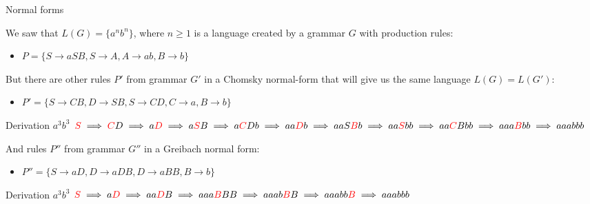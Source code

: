 \documentclass{beamer}
\begin{document}

\begin{frame}{Normal forms}

We saw that $L(G) = \{a^nb^n\}$, where $n\geq 1$ is a language created by a grammar $G$ with production rules:

\begin{itemize}
	\item $P = \{S\rightarrow aSB, S\rightarrow A, A \rightarrow ab, B\rightarrow b\}$
\end{itemize}

But there are other rules $P'$ from grammar $G'$ in a Chomsky normal-form that will give us the same language $L(G) = L(G')$:

\begin{itemize}
\item $P' = \{S \rightarrow CB, D \rightarrow SB, S \rightarrow CD, C \rightarrow a, B \rightarrow b\}$
\end{itemize}

\begin{block}{Derivation $a^3b^3$}
	$\textcolor{red}{S}\implies \textcolor{red}{C}D \implies a\textcolor{red}{D} \implies a\textcolor{red}{S}B\implies a\textcolor{red}{C}Db \implies aa\textcolor{red}{D}b \implies aaS\textcolor{red}{B}b \implies aa\textcolor{red}{S}bb \implies aa\textcolor{red}{C}Bbb \implies aaa\textcolor{red}{B}bb \implies aaabbb$
\end{block}

And rules $P''$ from grammar $G''$ in a Greibach normal form:

\begin{itemize}
\item $P'' = \{S \rightarrow aD, D \rightarrow aDB, D \rightarrow aBB, B \rightarrow b\}$
\end{itemize}

\begin{block}{Derivation $a^3b^3$}
	\footnotesize$\textcolor{red}{S}\implies a\textcolor{red}{D} \implies aa\textcolor{red}{D}B \implies aaa\textcolor{red}{B}BB \implies aaab\textcolor{red}{B}B \implies aaabb\textcolor{red}{B} \implies aaabb b $ 
\end{block}

\end{frame}

\end{document}
